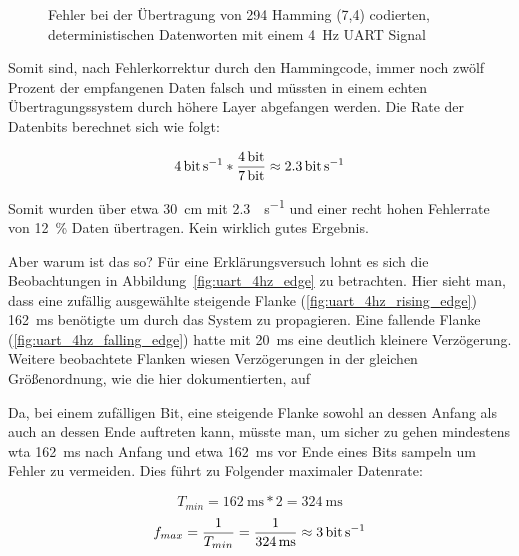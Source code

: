 \documentclass[12pt,a4paper]{article}
\begin{document}
\begin{figure}[H]
  \centering
  \caption{Fehler bei der Übertragung von 294 Hamming (7,4) codierten, deterministischen Datenworten mit einem \SI{4}{\hertz} UART Signal}
  \label{fig:sotware_uart_errors}
\end{figure}

Somit sind, nach Fehlerkorrektur durch den Hammingcode, immer noch zwölf Prozent der empfangenen Daten falsch und müssten in einem echten Übertragungssystem durch höhere Layer abgefangen werden. Die Rate der Datenbits berechnet sich wie folgt:

\begin{equation}
 \SI{4}{\bit\per\second} * \frac{\SI{4}{\bit}}{\SI{7}{\bit}} \approx \SI{2.3}{\bit\per\second}
\end{equation}

Somit wurden über etwa \SI{30}{\centi\meter} mit \SI{2.3}{\bit\per\second} und einer recht hohen Fehlerrate von \SI{12}{\percent} Daten übertragen. Kein wirklich gutes Ergebnis.

Aber warum ist das so? Für eine Erklärungsversuch lohnt es sich die Beobachtungen in Abbildung~\ref{fig:uart_4hz_edge} zu betrachten. Hier sieht man, dass eine zufällig ausgewählte steigende Flanke (\ref{fig:uart_4hz_rising_edge})  \SI{162}{\milli\second} benötigte um durch das System zu propagieren. Eine fallende Flanke (\ref{fig:uart_4hz_falling_edge}) hatte mit \SI{20}{\milli\second} eine deutlich kleinere Verzögerung. Weitere beobachtete Flanken wiesen Verzögerungen in der gleichen Größenordnung, wie die hier dokumentierten, auf

Da, bei einem zufälligen Bit, eine steigende Flanke sowohl an dessen Anfang als auch an dessen Ende auftreten kann, müsste man, um sicher zu gehen mindestens wta \SI{162}{\milli\second} nach Anfang und etwa \SI{162}{\milli\second} vor Ende eines Bits sampeln um Fehler zu vermeiden. Dies führt zu Folgender maximaler Datenrate:

\begin{equation}
	T_{min} = \SI{162}{\milli\second} * 2 = \SI{324}{\milli\second}
\end{equation}
\begin{equation}
	f_{max} = \frac{1}{T_{min}} = \frac{1}{\SI{324}{\milli\second}} \approx \SI{3}{\bit\per\second}
\end{equation}
\end{document}
